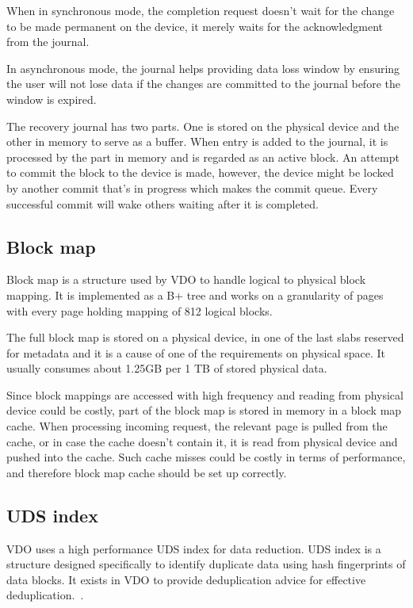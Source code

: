 \documentclass[
  color, %
  table, %
  lof,   %
  lot,   %
]{fithesis3}
\begin{document}
When in synchronous mode, the completion request doesn't wait for the change to be made permanent on the device, it merely waits for the acknowledgment from the journal.

In asynchronous mode, the journal helps providing data loss window by ensuring the user will not lose data if the changes are committed to the journal before the window is expired.

The recovery journal has two parts. One is stored on the physical device and the other in memory to serve as a buffer. When entry is added to the journal, it is processed by the part in memory and is regarded as an active block. An attempt to commit the block to the device is made, however, the device might be locked by another commit that's in progress which makes the commit queue. Every successful commit will wake others waiting after it is completed.


\subsection{Block map}
Block map is a structure used by VDO to handle logical to physical block mapping. It is implemented as a B+ tree and works on a granularity of pages with every page holding mapping of 812 logical blocks.

The full block map is stored on a physical device, in one of the last slabs reserved for metadata and it is a cause of one of the requirements on physical space. It usually consumes about 1.25GB per 1 TB of stored physical data.

Since block mappings are accessed with high frequency and reading from physical device could be costly, part of the block map is stored in memory in a block map cache. When processing incoming request, the relevant page is pulled from the cache, or in case the cache doesn't contain it, it is read from physical device and pushed into the cache. Such cache misses could be costly in terms of performance, and therefore block map cache should be set up correctly.

\subsection{UDS index}
VDO uses a high performance UDS index for data reduction. UDS index is a structure designed specifically to identify duplicate data using hash fingerprints of data blocks. It exists in VDO to provide deduplication advice for effective deduplication.~\cite{man:udsindex}.
\end{document}
